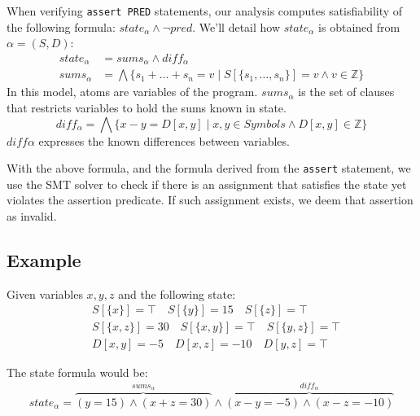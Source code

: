 When verifying \texttt{assert PRED} statements, our analysis computes satisfiability of the following formula: $state_\alpha\land\neg pred$. We'll detail how $state_\alpha$ is obtained from $\alpha = (S,D)$:
\begin{align*}
state_\alpha & = sums_\alpha \land diff_\alpha \\
sums_\alpha &= \bigwedge\{s_1+\ldots+s_n = v \mid S[\{s_1,\ldots,s_n\}] = v \wedge v \in \mathbb{Z}\}
\end{align*}
In this model, atoms are variables of the program. $sums_\alpha$ is the set of clauses that restricts variables to hold the sums known in state.
\begin{equation*}
diff_\alpha = \bigwedge\{ x - y = D[x,y] \mid x,y\in Symbols \wedge D[x,y] \in \mathbb{Z}\}
\end{equation*}
$diff\alpha$ expresses the known differences between variables.

With the above formula, and the formula derived from the \texttt{assert} statement, we use the SMT solver to check if there is an assignment that satisfies the state yet violates the assertion predicate. If such assignment exists, we deem that assertion as invalid.

\subsection*{Example}
Given variables $x,y,z$ and the following state:
\begin{align*}
&S[\{x\}] = \top \quad S[\{y\}] = 15 \quad S[\{z\}] = \top \\
&S[\{x,z\}] = 30\quad S[\{x,y\}] = \top \quad S[\{y,z\}] = \top\\
&D[x,y] = -5 \quad D[x,z] = -10 \quad D[y,z] = \top
\end{align*}

The state formula would be:
\begin{equation*}
state_\alpha = \overbrace{(y=15)\wedge(x+z=30)}^{sums_\alpha}\land\overbrace{(x-y=-5)\land(x-z=-10)}^{diff_\alpha}
\end{equation*}
